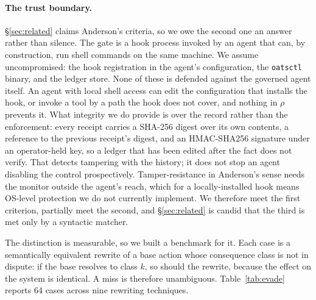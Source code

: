 \documentclass[10pt]{article}
\begin{document}
\paragraph{The trust boundary.} \S\ref{sec:related} claims Anderson's criteria, so we
owe the second one an answer rather than silence. The gate is a hook process invoked
by an agent that can, by construction, run shell commands on the same machine. We
assume uncompromised: the hook registration in the agent's configuration, the
\texttt{oatsctl} binary, and the ledger store. None of these is defended against the
governed agent itself. An agent with local shell access can edit the configuration
that installs the hook, or invoke a tool by a path the hook does not cover, and
nothing in $\rho$ prevents it. What integrity we do provide is over the record rather
than the enforcement: every receipt carries a SHA-256 digest over its own contents,
a reference to the previous receipt's digest, and an HMAC-SHA256 signature under an
operator-held key, so a ledger that has been edited after the fact does not verify.
That detects tampering with the history; it does not stop an agent disabling the
control prospectively. Tamper-resistance in Anderson's sense needs the monitor
outside the agent's reach, which for a locally-installed hook means OS-level
protection we do not currently implement. We therefore meet the first criterion,
partially meet the second, and \S\ref{sec:related} is candid that the third is met
only by a syntactic matcher.

The distinction is measurable, so we built a benchmark for it. Each case is a
semantically equivalent rewrite of a base action whose consequence class is not in
dispute: if the base resolves to class $k$, so should the rewrite, because the effect
on the system is identical. A miss is therefore unambiguous. Table~\ref{tab:evade}
reports 64 cases across nine rewriting techniques.
\end{document}
